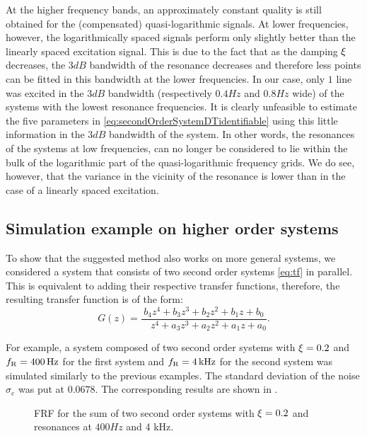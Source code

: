   At the higher frequency bands, an approximately constant quality is still obtained for the (compensated) quasi-logarithmic signals.
  At lower frequencies, however, the logarithmically spaced signals perform only slightly better than the linearly spaced excitation signal.
  This is due to the fact that as the damping $\xi$ decreases, the $3\unit{dB}$ bandwidth of the resonance decreases and therefore less points can be fitted in this bandwidth at the lower frequencies.
  In our case, only $1$ line was excited in the $3 \unit{dB}$ bandwidth (respectively $0.4 \unit{Hz}$ and $0.8\unit{Hz}$ wide) of the systems with the lowest resonance frequencies.
  It is clearly unfeasible to estimate the five parameters in
  \eqref{eq:secondOrderSystemDTidentifiable} using this little information in the $3\unit{dB}$ bandwidth of the system.
  In other words, the resonances of the systems at low frequencies, can no longer be considered to lie within the bulk of the logarithmic part of the quasi-logarithmic frequency grids.
  We do see, however, that the variance in the vicinity of the resonance is lower than in the case of a linearly spaced excitation.

  \subsection{Simulation example on higher order systems}
To show that the suggested method also works on more general systems, we considered a system that consists of two second order systems \eqref{eq:tf} in parallel. This is equivalent to adding their respective transfer functions, therefore, the resulting transfer function is of the form:
\begin{equation}
  G \left( z \right) 
  = \frac{         b_4 z^{4} + b_3 z^{3} + b_2 z^{2} + b_1 z + b_0}%
         {\phantom{a_4}z^{4} + a_3 z^{3} + a_2 z^{2} + a_1 z + a_0}
  \text{.}
\label{eq:tfO4}
\end{equation}

For example, a system composed of two second order systems with $\xi = 0.2$ and $f_{\mathrm{R}} = 400 \,\mathrm{Hz}$ for the first system and $f_{\mathrm{R}}=4 \,\mathrm{kHz}$ for the second system was simulated similarly to the previous examples. The standard deviation of the noise $\sigma_e$ was put at $0.0678$. The corresponding results are  shown in .

\begin{figure}%
  \centering
  \setlength{\figurewidth}{0.8\columnwidth}
  \setlength{\figureheight}{5cm}
  
  \caption{FRF for the sum of two second order systems with $\xi=0.2$ and
           resonances at $ 400 \unit{Hz}$ and 4 \unit{kHz}.}%
  \label{fig:sumSys}
\end{figure}

